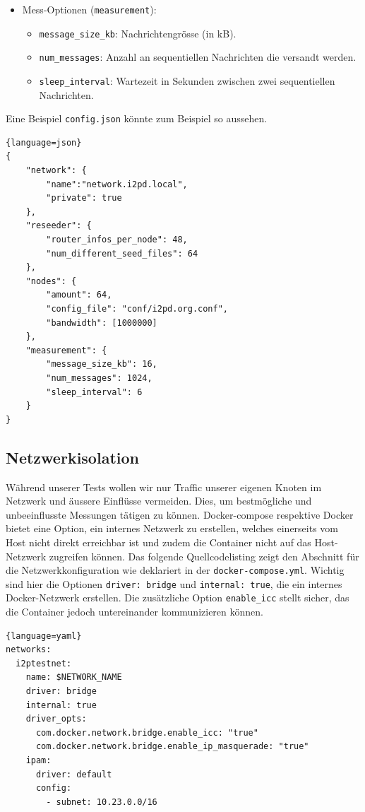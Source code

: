 \begin{itemize}
\begin{itemize}
        \end{itemize}
    \item Mess-Optionen (\lstinline|measurement|):
        \begin{itemize}
        \item \lstinline|message_size_kb|: Nachrichtengrösse (in kB).
        \item \lstinline|num_messages|: Anzahl an sequentiellen Nachrichten die versandt werden. 
        \item \lstinline|sleep_interval|: Wartezeit in Sekunden zwischen zwei sequentiellen Nachrichten.
        \end{itemize}
\end{itemize}

Eine Beispiel \lstinline|config.json| könnte zum Beispiel so aussehen.

\begin{lstlisting}{language=json}
{
    "network": {
        "name":"network.i2pd.local",
        "private": true
    },
    "reseeder": {
        "router_infos_per_node": 48,
        "num_different_seed_files": 64
    },
    "nodes": {
        "amount": 64,
        "config_file": "conf/i2pd.org.conf",
        "bandwidth": [1000000]
    },
    "measurement": {
        "message_size_kb": 16,
        "num_messages": 1024,
        "sleep_interval": 6
    }
}
\end{lstlisting}

\subsection{Netzwerkisolation}\label{sec:netzwerkisolation}

Während unserer Tests wollen wir nur Traffic unserer eigenen Knoten im Netzwerk und äussere Einflüsse vermeiden.
Dies, um bestmögliche und unbeeinflusste Messungen tätigen zu können.
Docker-compose respektive Docker bietet eine Option, ein internes Netzwerk zu erstellen,
welches einerseits vom Host nicht direkt erreichbar ist
und zudem die Container nicht auf das Host-Netzwerk zugreifen können.
Das folgende Quellcodelisting zeigt den Abschnitt für die Netzwerkkonfiguration wie deklariert in der \lstinline|docker-compose.yml|.
Wichtig sind hier die Optionen \lstinline|driver: bridge| und \lstinline|internal: true|, die ein internes Docker-Netzwerk erstellen.
Die zusätzliche Option \lstinline|enable_icc| stellt sicher, das die Container jedoch untereinander kommunizieren können.
\begin{lstlisting}{language=yaml}
networks:
  i2ptestnet:
    name: $NETWORK_NAME
    driver: bridge
    internal: true
    driver_opts:
      com.docker.network.bridge.enable_icc: "true"
      com.docker.network.bridge.enable_ip_masquerade: "true"
    ipam:
      driver: default
      config:
        - subnet: 10.23.0.0/16
\end{lstlisting}

